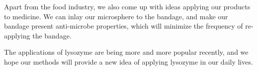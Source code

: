 Apart from the food industry, we also come up with ideas applying our products to medicine. We can inlay our microsphere to the bandage, and make our bandage present anti-microbe properties, which will minimize the frequency of re-applying the bandage.

The applications of lysozyme are being more and more popular recently, and we hope our methods will provide a new idea of applying lysozyme in our daily lives. 

